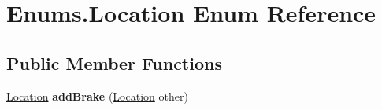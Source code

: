 \hypertarget{enumEnums_1_1Location}{}\section{Enums.\+Location Enum Reference}
\label{enumEnums_1_1Location}
\subsection*{Public Member Functions}
\begin{DoxyCompactItemize}
\item 
\hypertarget{enumEnums_1_1Location_afdfbde547421ed80e5c25973fbe0d141}{}\hyperlink{enumEnums_1_1Location}{Location} {\bfseries add\+Brake} (\hyperlink{enumEnums_1_1Location}{Location} other)\label{enumEnums_1_1Location_afdfbde547421ed80e5c25973fbe0d141}

\end{DoxyCompactItemize}
